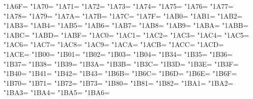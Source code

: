 \XeTeXcharclass"1A6F=\KclassCM
\XeTeXcharclass"1A70=\KclassCM
\XeTeXcharclass"1A71=\KclassCM
\XeTeXcharclass"1A72=\KclassCM
\XeTeXcharclass"1A73=\KclassCM
\XeTeXcharclass"1A74=\KclassCM
\XeTeXcharclass"1A75=\KclassCM
\XeTeXcharclass"1A76=\KclassCM
\XeTeXcharclass"1A77=\KclassCM
\XeTeXcharclass"1A78=\KclassCM
\XeTeXcharclass"1A79=\KclassCM
\XeTeXcharclass"1A7A=\KclassCM
\XeTeXcharclass"1A7B=\KclassCM
\XeTeXcharclass"1A7C=\KclassCM
\XeTeXcharclass"1A7F=\KclassCM
\XeTeXcharclass"1AB0=\KclassCM
\XeTeXcharclass"1AB1=\KclassCM
\XeTeXcharclass"1AB2=\KclassCM
\XeTeXcharclass"1AB3=\KclassCM
\XeTeXcharclass"1AB4=\KclassCM
\XeTeXcharclass"1AB5=\KclassCM
\XeTeXcharclass"1AB6=\KclassCM
\XeTeXcharclass"1AB7=\KclassCM
\XeTeXcharclass"1AB8=\KclassCM
\XeTeXcharclass"1AB9=\KclassCM
\XeTeXcharclass"1ABA=\KclassCM
\XeTeXcharclass"1ABB=\KclassCM
\XeTeXcharclass"1ABC=\KclassCM
\XeTeXcharclass"1ABD=\KclassCM
\XeTeXcharclass"1ABF=\KclassCM
\XeTeXcharclass"1AC0=\KclassCM
\XeTeXcharclass"1AC1=\KclassCM
\XeTeXcharclass"1AC2=\KclassCM
\XeTeXcharclass"1AC3=\KclassCM
\XeTeXcharclass"1AC4=\KclassCM
\XeTeXcharclass"1AC5=\KclassCM
\XeTeXcharclass"1AC6=\KclassCM
\XeTeXcharclass"1AC7=\KclassCM
\XeTeXcharclass"1AC8=\KclassCM
\XeTeXcharclass"1AC9=\KclassCM
\XeTeXcharclass"1ACA=\KclassCM
\XeTeXcharclass"1ACB=\KclassCM
\XeTeXcharclass"1ACC=\KclassCM
\XeTeXcharclass"1ACD=\KclassCM
\XeTeXcharclass"1ACE=\KclassCM
\XeTeXcharclass"1B00=\KclassCM
\XeTeXcharclass"1B01=\KclassCM
\XeTeXcharclass"1B02=\KclassCM
\XeTeXcharclass"1B03=\KclassCM
\XeTeXcharclass"1B04=\KclassCM
\XeTeXcharclass"1B34=\KclassCM
\XeTeXcharclass"1B35=\KclassCM
\XeTeXcharclass"1B36=\KclassCM
\XeTeXcharclass"1B37=\KclassCM
\XeTeXcharclass"1B38=\KclassCM
\XeTeXcharclass"1B39=\KclassCM
\XeTeXcharclass"1B3A=\KclassCM
\XeTeXcharclass"1B3B=\KclassCM
\XeTeXcharclass"1B3C=\KclassCM
\XeTeXcharclass"1B3D=\KclassCM
\XeTeXcharclass"1B3E=\KclassCM
\XeTeXcharclass"1B3F=\KclassCM
\XeTeXcharclass"1B40=\KclassCM
\XeTeXcharclass"1B41=\KclassCM
\XeTeXcharclass"1B42=\KclassCM
\XeTeXcharclass"1B43=\KclassCM
\XeTeXcharclass"1B6B=\KclassCM
\XeTeXcharclass"1B6C=\KclassCM
\XeTeXcharclass"1B6D=\KclassCM
\XeTeXcharclass"1B6E=\KclassCM
\XeTeXcharclass"1B6F=\KclassCM
\XeTeXcharclass"1B70=\KclassCM
\XeTeXcharclass"1B71=\KclassCM
\XeTeXcharclass"1B72=\KclassCM
\XeTeXcharclass"1B73=\KclassCM
\XeTeXcharclass"1B80=\KclassCM
\XeTeXcharclass"1B81=\KclassCM
\XeTeXcharclass"1B82=\KclassCM
\XeTeXcharclass"1BA1=\KclassCM
\XeTeXcharclass"1BA2=\KclassCM
\XeTeXcharclass"1BA3=\KclassCM
\XeTeXcharclass"1BA4=\KclassCM
\XeTeXcharclass"1BA5=\KclassCM
\XeTeXcharclass"1BA6=\KclassCM
